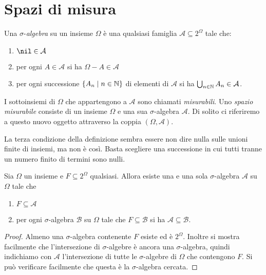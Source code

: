
\section{Spazi di misura}

\begin{definizione}\label{definizione:SpaziMisurabili}
Una \(\sigma\)-{\em algebra}  su un insieme \(\Omega\) è una qualsiasi famiglia \(\mathcal A \subseteq 2^\Omega\) tale che:
\begin{enumerate}
\item \(\nil \in \mathcal A\)
\item per ogni \(A \in \mathcal A\) si ha \(\Omega - A \in \mathcal A\)
\item per ogni successione \(\left\{A_n \mid n \in \mathbb N\right\}\) di elementi di \(\mathcal A\) si ha \(\bigcup_{n \in \mathbb N} A_n \in \mathcal A\).
\end{enumerate}
I sottoinsiemi di \(\Omega\) che appartengono a \(\mathcal A\) sono chiamati {\em misurabili}. Uno {\em spazio misurabile}  consiste di un insieme \(\Omega\) e una sua \(\sigma\)-algebra \(\mathcal A\). Di solito ci riferiremo a questo nuovo oggetto attraverso la coppia \((\Omega, \mathcal A)\).
\end{definizione}

\begin{osservazione}
La terza condizione della definizione sembra essere non dire nulla sulle unioni finite di insiemi, ma non è così. Basta scegliere una successione in cui tutti tranne un numero finito di termini sono nulli.
\end{osservazione}

\begin{proposizione}
Sia \(\Omega\) un insieme e \(F \subseteq 2^\Omega\) qualsiasi. Allora esiste una e una sola \(\sigma\)-algebra \(\mathcal A\) su \(\Omega\) tale che 
\begin{enumerate}
\item \(F \subseteq \mathcal A\)
\item per ogni \(\sigma\)-algebra \(\mathcal B\) su \(\Omega\) tale che \(F \subseteq \mathcal B\) si ha \(\mathcal A \subseteq \mathcal B\). 
\end{enumerate}
\end{proposizione}

\begin{proof}
Almeno una \(\sigma\)-algebra contenente \(F\) esiste ed è \(2^\Omega\). Inoltre si mostra facilmente che l'intersezione di \(\sigma\)-algebre è ancora una \(\sigma\)-algebra, quindi indichiamo con \(\mathcal A\) l'intersezione di tutte le \(\sigma\)-algebre di \(\Omega\) che contengono \(F\). Si può verificare facilmente che questa è la \(\sigma\)-algebra cercata.
\end{proof}

